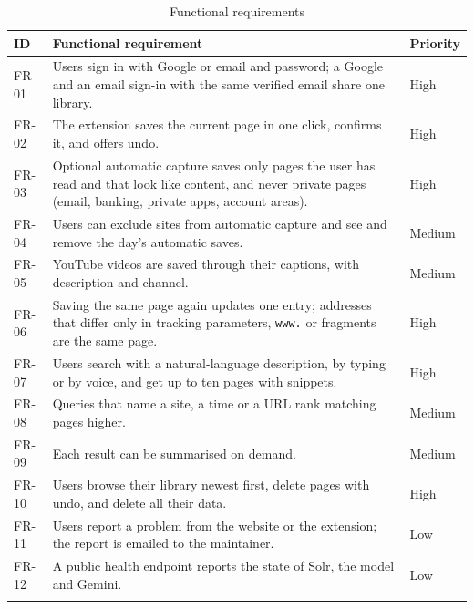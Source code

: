 \begin{longtable}{>{\ttfamily}p{} p{} p{}}
\toprule
\textrm{\textbf{ID}} & \textbf{Functional requirement} & \textbf{Priority} \\
\midrule
\endhead
FR-01 & Users sign in with Google or email and password; a Google and an email sign-in with the same verified email share one library. & High \\
FR-02 & The extension saves the current page in one click, confirms it, and offers undo. & High \\
FR-03 & Optional automatic capture saves only pages the user has read and that look like content, and never private pages (email, banking, private apps, account areas). & High \\
FR-04 & Users can exclude sites from automatic capture and see and remove the day's automatic saves. & Medium \\
FR-05 & YouTube videos are saved through their captions, with description and channel. & Medium \\
FR-06 & Saving the same page again updates one entry; addresses that differ only in tracking parameters, \texttt{www.} or fragments are the same page. & High \\
FR-07 & Users search with a natural-language description, by typing or by voice, and get up to ten pages with snippets. & High \\
FR-08 & Queries that name a site, a time or a URL rank matching pages higher. & Medium \\
FR-09 & Each result can be summarised on demand. & Medium \\
FR-10 & Users browse their library newest first, delete pages with undo, and delete all their data. & High \\
FR-11 & Users report a problem from the website or the extension; the report is emailed to the maintainer. & Low \\
FR-12 & A public health endpoint reports the state of Solr, the model and Gemini. & Low \\
\bottomrule
\caption{Functional requirements}
\label{tab:fr}
\end{longtable}

